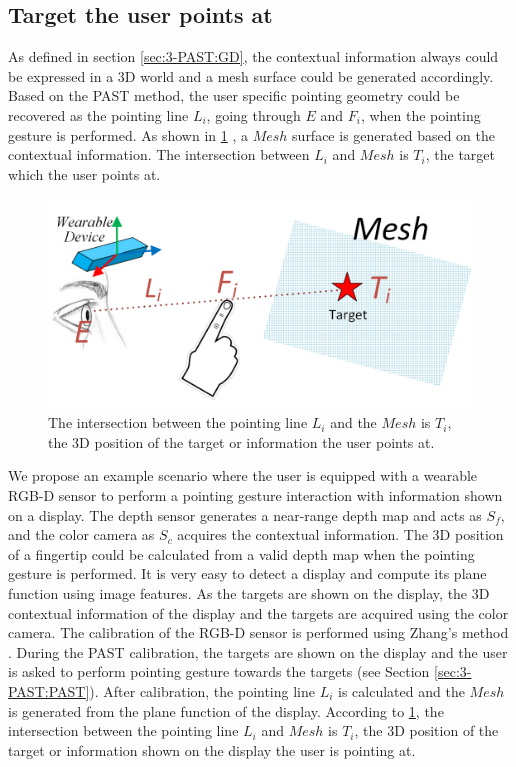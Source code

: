 \subsection{Target the user points at} \label{sec:3-PAST:findTarget}
As defined in section \ref{sec:3-PAST:GD}, the contextual information always could be expressed in a 3D world and a mesh surface could be generated accordingly. 
Based on the PAST method, the user specific pointing geometry could be recovered as the pointing line $L_{i}$, going through $E$ and  $F_i$, when the pointing gesture is performed.
As shown in \figurename{ \ref{fig:3-PAST:pointToTarget}} , a $Mesh$ surface is generated based on the contextual information. The intersection between $L_{i}$ and $Mesh$ is $T_i$, the target which the user points at. 
\begin{figure} [htb]
	\centering
	\includegraphics[width= \linewidth]{figures/3-PAST/pointToTarget.png}
	\caption{ The intersection between the pointing line $L_{i}$ and the $Mesh$ is  $T_i$, the 3D position of the target or information the user points at.}
	\label{fig:3-PAST:pointToTarget}
\end{figure}

We propose an example scenario where the user is equipped with a wearable RGB-D sensor to perform a pointing gesture interaction with information shown on a display.
The depth sensor generates a near-range depth map and acts as $S_f$, and the color camera as $S_c$ acquires the contextual information. The 3D position of a fingertip could be calculated from a valid depth map when the pointing gesture is performed. It is very easy to detect a display and compute its plane function using image features. As the targets are shown on the display, the 3D contextual information of the display and the targets are acquired using the color camera. The calibration of the RGB-D sensor is performed using Zhang{\rq}s method \cite{Zhang2000}. During the PAST calibration, the targets are shown on the display and the user is asked to perform pointing gesture towards the targets (see Section \ref{sec:3-PAST:PAST}). After calibration, the pointing line $L_i$ is calculated and the  $Mesh$ is generated from the plane function of the display. According to \figurename{ \ref{fig:3-PAST:pointToTarget}}, the intersection between the pointing line $L_{i}$ and $Mesh$ is  $T_i$, the 3D position of the target or information shown on the display the user is pointing at.

